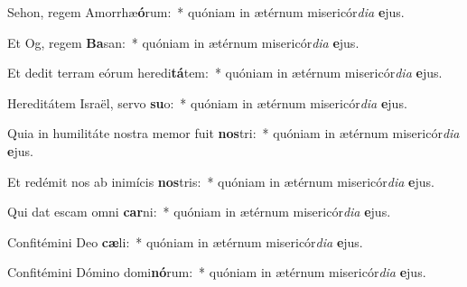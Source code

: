 \item Sehon, regem Amorrhæ\textbf{ó}rum:~* quóniam in ætérnum misericór\textit{di}\textit{a} \textbf{e}jus.
\item Et Og, regem \textbf{Ba}san:~* quóniam in ætérnum misericór\textit{di}\textit{a} \textbf{e}jus.
\item Et dedit terram eórum heredi\textbf{tá}tem:~* quóniam in ætérnum misericór\textit{di}\textit{a} \textbf{e}jus.
\item Hereditátem Israël, servo \textbf{su}o:~* quóniam in ætérnum misericór\textit{di}\textit{a} \textbf{e}jus.
\item Quia in humilitáte nostra memor fuit \textbf{nos}tri:~* quóniam in ætérnum misericór\textit{di}\textit{a} \textbf{e}jus.
\item Et redémit nos ab inimícis \textbf{nos}tris:~* quóniam in ætérnum misericór\textit{di}\textit{a} \textbf{e}jus.
\item Qui dat escam omni \textbf{car}ni:~* quóniam in ætérnum misericór\textit{di}\textit{a} \textbf{e}jus.
\item Confitémini Deo \textbf{cæ}li:~* quóniam in ætérnum misericór\textit{di}\textit{a} \textbf{e}jus.
\item Confitémini Dómino domi\textbf{nó}rum:~* quóniam in ætérnum misericór\textit{di}\textit{a} \textbf{e}jus.
